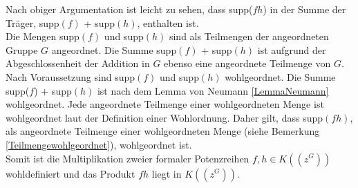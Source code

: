 {Nach obiger Argumentation ist leicht zu sehen, dass supp($fh$) in der Summe der Träger, supp$(f)$ + supp$(h)$, enthalten ist. \\ 
Die Mengen supp$(f)$ und supp$(h)$ sind als Teilmengen der angeordneten Gruppe $G$ angeordnet. Die Summe supp$(f)$ + supp$(h)$ ist aufgrund der Abgeschlossenheit der Addition in $G$ ebenso eine angeordnete Teilmenge von $G$. 
Nach Voraussetzung sind supp$(f)$ und supp$(h)$ wohlgeordnet. Die Summe supp($f$) + supp$(h)$ ist nach dem Lemma von Neumann \ref{LemmaNeumann} wohlgeordnet. Jede angeordnete Teilmenge einer wohlgeordneten Menge ist wohlgeordnet laut der Definition einer Wohlordnung. Daher gilt, dass supp$(fh)$, als angeordnete Teilmenge einer wohlgeordneten Menge (siehe Bemerkung \ref{Teilmengewohlgeordnet}), wohlgeordnet ist. \\
Somit ist die Multiplikation zweier formaler Potenzreihen $f,h \in K\left(\left(z^G\right)\right)$ wohldefiniert und das Produkt $fh$ liegt in $K\left(\left(z^G\right)\right)$.



}
